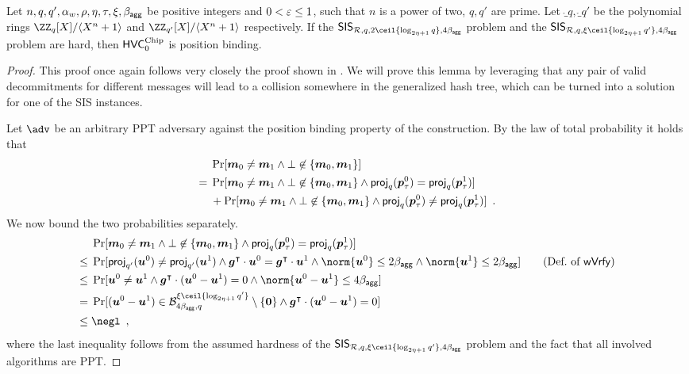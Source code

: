 \begin{lemma}\label{lem:hvcposbind}
  Let $n,q,q',\alpha_w,\rho,\eta,\tau,\xi,\beta_{\mathsf{agg}}$ be positive integers and $0 < \varepsilon \leq 1$, such that $n$ is a power of two, $q,q'$ are prime.
  Let $\ring_q,\ring_{q'}$ be the polynomial rings $\defringq$ and $\defringqq$ respectively.
  If the $\sis_{\ring,q,2\ceil{\log_{2\eta+1} q},4\bagg}$ problem and the $\sis_{\ring,q,\xi\ceil{\log_{2\eta+1} q'},4\bagg}$ problem are hard, then $\mathsf{HVC}^{\textup{Chip}}_{0}$ is position binding.
\end{lemma}
\begin{proof}
This proof once again follows very closely the proof shown in \cite{CCS:FleSimZha22}.
We will prove this lemma by leveraging that any pair of valid decommitments for different messages will lead to a collision somewhere in the generalized hash tree, which can be turned into a solution for one of the SIS instances. 

  Let $\adv$ be an arbitrary PPT adversary against the position binding property of the construction.
%  
  By the law of total probability it holds that
  \begin{align*}
    &\Pr[\boldsymbol{m}_0\neq \boldsymbol{m}_1 \land \bot\not\in\{\boldsymbol{m}_0,\boldsymbol{m}_1\}]\\
    ={}& \Pr[\boldsymbol{m}_0\neq \boldsymbol{m}_1 \land \bot\not\in\{\boldsymbol{m}_0,\boldsymbol{m}_1\} \land \mathsf{proj}_{q}(\boldsymbol{p}_\tau^0) = \mathsf{proj}_{q}(\boldsymbol{p}_\tau^1)]\\& 
    +
    \Pr[\boldsymbol{m}_0\neq \boldsymbol{m}_1 \land \bot\not\in\{\boldsymbol{m}_0,\boldsymbol{m}_1\} \land \mathsf{proj}_{q}(\boldsymbol{p}_\tau^0) \neq \mathsf{proj}_{q}(\boldsymbol{p}_\tau^1)]\enspace.
  \end{align*}
%
  We now bound the two probabilities separately.
%  
  \begin{align*}
    &\Pr[\vec{m}_0\neq \vec{m}_1 \land \bot\not\in\{\vec{m}_0,\vec{m}_1\} \land \projmod{q}(\vec{p}_\tau^0) = \projmod{q}(\vec{p}_\tau^1)]\\
    \leq{}&\Pr[\projmod{q'}(\vec{u}^0) \neq \projmod{q'}(\vec{u}^1) \land \vec{g}^\transpose\cdot \vec{u}^0 = \vec{g}^\transpose\cdot \vec{u}^1 \land \norm{\vec{u}^0}\leq 2\bagg \land \norm{\vec{u}^1}\leq 2\bagg]\tag{Def.\ of $\wverify$}\\
    \leq{}& \Pr[\vec{u}^0 \neq \vec{u}^1 \land \vec{g}^\transpose\cdot (\vec{u}^0-\vec{u}^1) = 0 \land \norm{\vec{u}^0-\vec{u}^1}\leq 4\bagg]\\
    = {}& \Pr[(\vec{u}^0-\vec{u}^1) \in \ball{4\bagg}{q}^{\xi\ceil{\log_{2\eta+1}q'}}\setminus \{\vec{0}\} \land \vec{g}^\transpose\cdot (\vec{u}^0-\vec{u}^1) = 0]\\
    \leq{}& \negl\enspace,
  \end{align*}
  where the last inequality follows from the assumed hardness of the $\sis_{\ring,q,\xi\ceil{\log_{2\eta+1} q'},4\bagg}$ problem and the fact that all involved algorithms are PPT.
  

\end{proof}
